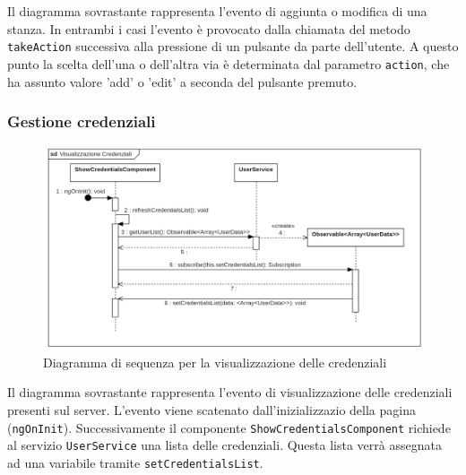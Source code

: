 Il diagramma sovrastante rappresenta l'evento di aggiunta o modifica di una stanza.
In entrambi i casi l'evento è provocato dalla chiamata del metodo \texttt{takeAction} successiva alla pressione di un pulsante da parte dell'utente. A questo punto la scelta dell'una o dell'altra via è determinata dal parametro \texttt{action}, che ha assunto valore 'add' o 'edit' a seconda del pulsante premuto.
\subsubsection{Gestione credenziali}
\begin{figure}[H]
	\centering
	\includegraphics[width=18cm]{res/images/webapp-showCredentials-diagrammaSequenza.png}
	\caption{Diagramma di sequenza per la visualizzazione delle credenziali}
	\label{fig:DiagrammaSequenzaVisualizzazioneCredenziali}
\end{figure}
Il diagramma sovrastante rappresenta l'evento di visualizzazione delle credenziali presenti sul server. L'evento viene scatenato dall'inizializzazio della pagina (\texttt{ngOnInit}). Successivamente il componente \texttt{ShowCredentialsComponent} richiede al servizio \texttt{UserService} una lista delle credenziali. Questa lista verrà assegnata ad una variabile tramite \texttt{setCredentialsList}.
